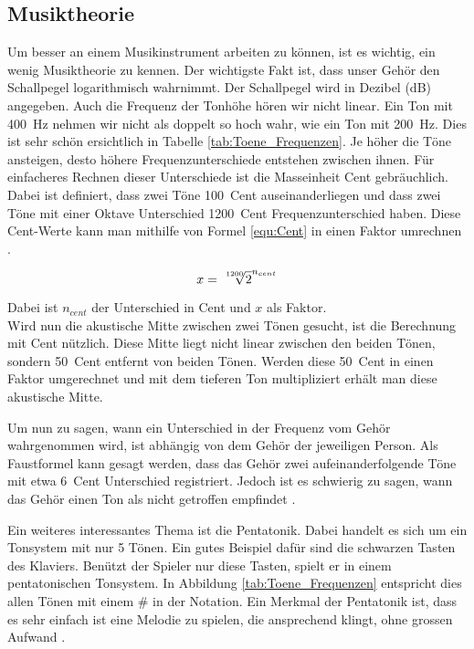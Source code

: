 \subsection{Musiktheorie}\label{subsec:Musiktheorie}

Um besser an einem Musikinstrument arbeiten zu können, ist es wichtig, ein wenig Musiktheorie zu kennen. Der wichtigste Fakt ist, dass unser Gehör den Schallpegel logarithmisch wahrnimmt. Der Schallpegel wird in Dezibel (dB) angegeben. Auch die Frequenz der Tonhöhe hören wir nicht linear. Ein Ton mit \SI{400}{Hz} nehmen wir nicht als doppelt so hoch wahr, wie ein Ton mit \SI{200}{Hz}. Dies ist sehr schön ersichtlich in Tabelle \ref{tab:Toene_Frequenzen}. Je höher die Töne ansteigen, desto höhere Frequenzunterschiede entstehen zwischen ihnen. Für einfacheres Rechnen dieser Unterschiede ist die Masseinheit Cent gebräuchlich. Dabei ist definiert, dass zwei Töne \SI{100}{Cent} auseinanderliegen und dass zwei Töne mit einer Oktave Unterschied \SI{1200}{Cent} Frequenzunterschied haben. Diese Cent-Werte kann man mithilfe von Formel \ref{equ:Cent} in einen Faktor umrechnen \cite{Cent}.

\begin{equation}
x = \sqrt[\leftroot{-2}\uproot{1}1200]{2}^{n_{cent}}
\label{equ:Cent}
\end{equation} 

Dabei ist \(n_{cent}\) der Unterschied in Cent und \(x\) als Faktor.\\
Wird nun die \glqq akustische\grqq{} Mitte zwischen zwei Tönen gesucht, ist die Berechnung mit Cent nützlich. Diese Mitte liegt nicht linear zwischen den beiden Tönen, sondern \SI{50}{Cent} entfernt von beiden Tönen. Werden diese \SI{50}{Cent} in einen Faktor umgerechnet und mit dem tieferen Ton multipliziert erhält man diese \glqq akustische\grqq{} Mitte.

Um nun zu sagen, wann ein Unterschied in der Frequenz vom Gehör wahrgenommen wird, ist abhängig von dem Gehör der jeweiligen Person. Als Faustformel kann gesagt werden, dass das Gehör zwei aufeinanderfolgende Töne mit etwa \SI{6}{Cent} Unterschied registriert. Jedoch ist es schwierig zu sagen, wann das Gehör einen Ton als \glqq nicht getroffen\grqq{} empfindet \cite{Cent}.

Ein weiteres interessantes Thema ist die Pentatonik. Dabei handelt es sich um ein Tonsystem mit nur 5 Tönen. Ein gutes Beispiel dafür sind die schwarzen Tasten des Klaviers. Benützt der Spieler nur diese Tasten, spielt er in einem pentatonischen Tonsystem. In Abbildung \ref{tab:Toene_Frequenzen} entspricht dies allen Tönen mit einem \# in der Notation. Ein Merkmal der Pentatonik ist, dass es sehr einfach ist eine Melodie zu spielen, die ansprechend klingt, ohne grossen Aufwand \cite{Pentatonik}.



